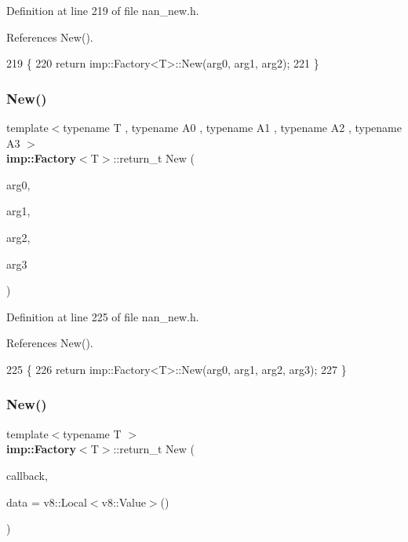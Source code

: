 Definition at line 219 of file nan\+\_\+new.\+h.



References New().


\begin{DoxyCode}
219                                \{
220   \textcolor{keywordflow}{return} imp::Factory<T>::New(arg0, arg1, arg2);
221 \}
\end{DoxyCode}
\mbox{\label{nan__new_8h_af1eb8571157b8e55badf79d450961b59}} 
\subsubsection{New()\hspace{0.1cm}{\footnotesize\ttfamily [5/22]}}
{\footnotesize\ttfamily template$<$typename T , typename A0 , typename A1 , typename A2 , typename A3 $>$ \\
\textbf{ imp\+::\+Factory}$<$T$>$\+::return\+\_\+t New (\begin{DoxyParamCaption}\item[{A0}]{arg0,  }\item[{A1}]{arg1,  }\item[{A2}]{arg2,  }\item[{A3}]{arg3 }\end{DoxyParamCaption})}



Definition at line 225 of file nan\+\_\+new.\+h.



References New().


\begin{DoxyCode}
225                                         \{
226   \textcolor{keywordflow}{return} imp::Factory<T>::New(arg0, arg1, arg2, arg3);
227 \}
\end{DoxyCode}
\mbox{\label{nan__new_8h_a05b3b25c18c9200f7e640cb2ca33dbf9}} 
\subsubsection{New()\hspace{0.1cm}{\footnotesize\ttfamily [6/22]}}
{\footnotesize\ttfamily template$<$typename T $>$ \\
\textbf{ imp\+::\+Factory}$<$T$>$\+::return\+\_\+t New (\begin{DoxyParamCaption}\item[{\textbf{ Function\+Callback}}]{callback,  }\item[{v8\+::\+Local$<$ v8\+::\+Value $>$}]{data = {\ttfamily v8\+:\+:Local$<$v8\+:\+:Value$>$()} }\end{DoxyParamCaption})}



